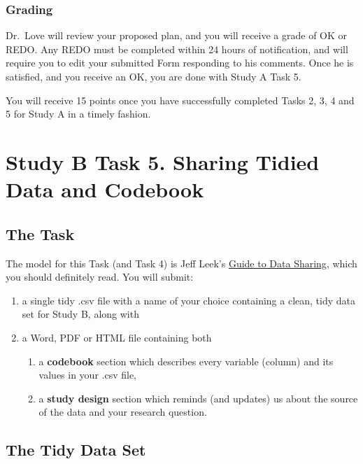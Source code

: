 \documentclass[]{book}
\providecommand{\tightlist}{%
  \setlength{\itemsep}{0pt}\setlength{\parskip}{0pt}}
\begin{document}
\hypertarget{grading-7}{%
\subsection{Grading}\label{grading-7}}

Dr.~Love will review your proposed plan, and you will receive a grade of OK or REDO. Any REDO must be completed within 24 hours of notification, and will require you to edit your submitted Form responding to his comments. Once he is satisfied, and you receive an OK, you are done with Study A Task 5.

You will receive 15 points once you have successfully completed Tasks 2, 3, 4 and 5 for Study A in a timely fashion.

\hypertarget{task5b}{%
\chapter{Study B Task 5. Sharing Tidied Data and Codebook}\label{task5b}}

\hypertarget{the-task-5}{%
\section{The Task}\label{the-task-5}}

The model for this Task (and Task 4) is Jeff Leek's \href{https://github.com/jtleek/datasharing}{Guide to Data Sharing}, which you should definitely read. You will submit:

\begin{enumerate}
\def\labelenumi{\arabic{enumi}.}
\tightlist
\item
  a single tidy .csv file with a name of your choice containing a clean, tidy data set for Study B, along with
\item
  a Word, PDF or HTML file containing both

  \begin{enumerate}
  \def\labelenumii{\alph{enumii}.}
  \tightlist
  \item
    a \textbf{codebook} section which describes every variable (column) and its values in your .csv file,
  \item
    a \textbf{study design} section which reminds (and updates) us about the source of the data and your research question.
  \end{enumerate}
\end{enumerate}

\hypertarget{the-tidy-data-set}{%
\section{The Tidy Data Set}\label{the-tidy-data-set}}
\end{document}
